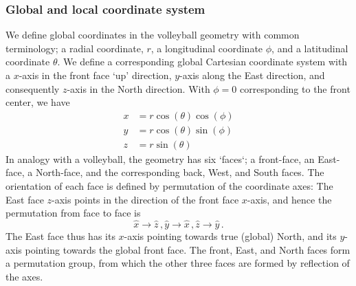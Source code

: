 \documentclass[paper=a4,fontsize=11pt]{scrartcl}
\numberwithin{equation}{section}		%
\numberwithin{figure}{section}			%
\numberwithin{table}{section}				%
\begin{document}
\subsubsection{Global and local coordinate system}

We define global coordinates in the volleyball geometry with common terminology; a radial coordinate, $r$, a longitudinal coordinate $\phi$, and a latitudinal coordinate $\theta$.  We define a corresponding global Cartesian coordinate system with a $x$-axis  in the front face `up' direction, $y$-axis along the East direction, and consequently $z$-axis in the North direction.  With $\phi=0$ corresponding to the front center, we have
\begin{align}
    x &= r \cos(\theta) \cos(\phi) \\
    y &= r \cos(\theta) \sin(\phi) \\
    z &= r \sin(\theta) 
\end{align}
In analogy with a volleyball, the geometry has six `faces`; a front-face, an East-face, a North-face, and the corresponding back, West, and South faces.  The orientation of each face is defined by permutation of the coordinate axes:  The East face $z$-axis points in the direction of the front face $x$-axis, and hence the permutation from face to face is 
\begin{equation}
    \hat{x} \rightarrow \hat{z} \,,
    \hat{y} \rightarrow \hat{x} \,,
    \hat{z} \rightarrow \hat{y} \,.
\end{equation}
The East face thus has its $x$-axis pointing towards true (global) North, and its $y$-axis pointing towards the global front face.  The front, East, and North faces form a permutation group, from which the other three faces are formed by reflection of the axes.
\end{document}
